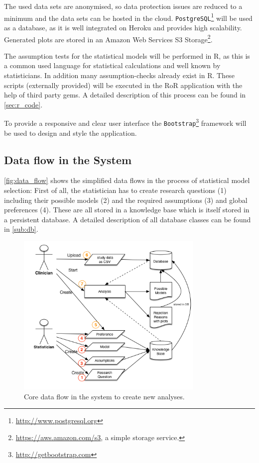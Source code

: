 The used data sets are anonymised, so data protection issues are reduced to a minimum and the data sets can be hosted in the cloud. \texttt{PostgreSQL}\footnote{\url{http://www.postgresql.org}} will be used as a database, as it is well integrated on Heroku and provides high scalability. Generated plots are stored in an Amazon Web Services S3 Storage\footnote{\url{https://aws.amazon.com/s3}, a simple storage service.}.

The assumption tests for the statistical models will be performed in \gls{R}, as this is a common used language for statistical calculations and well known by statisticians. In addition many assumption-checks already exist in \gls{R}. These scripts (externally provided) will be executed in the \gls{RoR} application with the help of third party gems. A detailed description of this process can be found in \autoref{sec:r_code}.

To provide a responsive and clear user interface the \texttt{Bootstrap}\footnote{\url{http://getbootstrap.com}} framework will be used to design and style the application. 

\subsection{Data flow in the System}


\autoref{fig:data_flow} shows the simplified data flows in the process of statistical model selection: First of all, the statistician has to create research questions (1) including their possible models (2) and the required assumptions (3) and global preferences (4). These are all stored in a knowledge base which is itself stored in  a persistent database. A detailed description of all database classes can be found in \autoref{sub:db}. 

\begin{figure}[btph]
	\centering
	\includegraphics[width=0.8\textwidth]{figures/data_flow}
	\caption{Core data flow in the system to create new analyses.}
	\label{fig:data_flow}
\end{figure}


